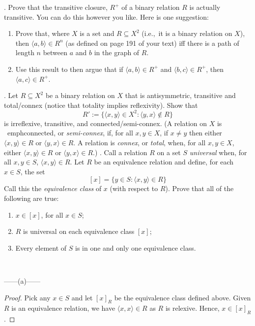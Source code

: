 \documentclass[12pt]{article}
\begin{document}
\newpage
{}. Prove that the transitive closure, $R^+$ of a binary relation $R$ is actually 
transitive. You can do this however you like. Here is one suggestion:
\begin{enumerate}
\renewcommand{\labelenumi}{\alph{enumi}.}
\item Prove that, where $X$ is a set and $R \subseteq X^2$ (i.e.,\ it is a binary 
relation on $X$), then $\langle a,b \rangle \in R^n$ (as defined on page 191 of 
your text) iff there is a path of length $n$ between $a$ and $b$ in the graph of 
$R$. 
\item Use this result to then argue that if $\langle a,b\rangle \in R^+$ and 
$\langle b,c\rangle \in R^+$, then $\langle a,c\rangle \in R^+$.
\end{enumerate}
\newpage
{}. Let $R \subseteq X^2$ be a binary relation on $X$ that is antisymmetric, 
transitive and total/connex (notice that totality implies reflexivity). Show that 
$$R' := \{\langle x,y \rangle \in X^2: \langle y, x \rangle \notin R\}$$
\noindent
is irreflexive, transitive, and connected/semi-connex. (A relation on $X$  is \
emph{connected}, or \emph{semi-connex}, if, for all $x,y \in X$, if $x\neq y$ then 
either $\langle x, y \rangle \in R$ or $\langle y, x \rangle \in R$. A relation 
is \emph{connex}, or \emph{total}, when, for all $x,y \in X$, either $\langle x, 
y \rangle \in R$ or $\langle y, x \rangle \in R$.)
\newpage
{}. Call a relation $R$ on a set $S$ \emph{universal} when, for all $x, y \in S$, 
$\langle x, y \rangle \in R$. Let $R$ be an equivalence relation and define, for each
$x \in S$, the set 
$$[x] = \{y \in S : \langle x , y \rangle \in R\}$$
\noindent
Call this the \emph{equivalence class} of $x$ (with respect to $R$). Prove that all
of the following are true:
\begin{enumerate}
\renewcommand{\labelenumi}{\alph{enumi}.}
\item $x \in [x]$, for all $x \in S$;
\item $R$ is universal on each equivalence class $[x]$;
\item Every element of $S$ is in one and only one equivalence class.
\end{enumerate}
~~~
\begin{center}
    ------(a)------
\end{center}
\begin{proof}
    Pick any $x \in S$ and let $[x]_R$ be the equivalence class defined above. 
    Given $R$ is an equivalence relation, we have $\langle x,x \rangle \in R$ as $R$ is relexive.
    Hence, $x \in [x]_R$.
\end{proof}
\end{document}
